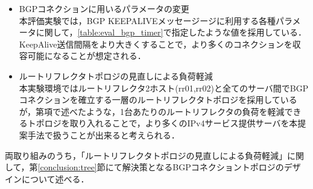 \begin{itemize}
    \item BGPコネクションに用いるパラメータの変更 \\
    本評価実験では，BGP KEEPALIVEメッセージージに利用する各種パラメータに関して，\ref{table:eval_bgp_timer}で指定したような値を採用している．KeepAlive送信間隔をより大きくすることで，より多くのコネクションを収容可能になることが想定される．
    \item ルートリフレクタトポロジの見直しによる負荷軽減 \\
    本実験環境ではルートリフレクタ2ホスト(rr01,rr02)と全てのサーバ間でBGPコネクションを確立する一層のルートリフレクタトポロジを採用しているが，第\label{proposal:network_rr}項で述べたような，1台あたりのルートリフレクタの負荷を軽減できるトポロジを取り入れることで，より多くのIPv4サービス提供サーバを本提案手法で扱うことが出来ると考えられる．
\end{itemize}

両取り組みのうち，「ルートリフレクタトポロジの見直しによる負荷軽減」に関して，第\ref{conclusion:tree}節にて解決策となるBGPコネクショントポロジのデザインについて述べる．


